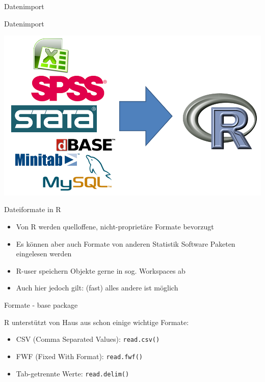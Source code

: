 \documentclass[ignorenonframetext,]{beamer}
\providecommand{\tightlist}{%
\setlength{\itemsep}{0pt}\setlength{\parskip}{0pt}}
\begin{document}
\begin{frame}[fragile]{Datenimport}

\begin{block}{Datenimport}

\includegraphics{./tex2pdf.9796/c6299486de2fc9d0f47deb7c7690d9756466e12d.png}

\end{block}

\begin{block}{Dateiformate in R}

\begin{itemize}
\tightlist
\item
  Von R werden quelloffene, nicht-proprietäre Formate bevorzugt
\item
  Es können aber auch Formate von anderen Statistik Software Paketen
  eingelesen werden
\item
  R-user speichern Objekte gerne in sog. Workspaces ab
\item
  Auch hier jedoch gilt: (fast) alles andere ist möglich
\end{itemize}

\end{block}

\begin{block}{Formate - base package}

R unterstützt von Haus aus schon einige wichtige Formate:

\begin{itemize}
\tightlist
\item
  CSV (Comma Separated Values): \texttt{read.csv()}
\item
  FWF (Fixed With Format): \texttt{read.fwf()}
\item
  Tab-getrennte Werte: \texttt{read.delim()}
\end{itemize}


\end{block}
\end{frame}
\end{document}
